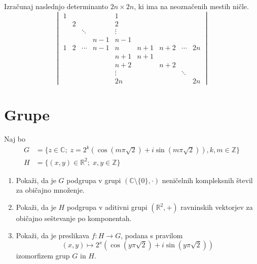 \documentclass[a4paper,12pt]{article}
\begin{document}
Izračunaj naslednjo determinanto \(2n \times 2n\), ki ima na neoznačenih mestih ničle.
\[\begin{vmatrix}
1 &   &        &     & 1   &     &     &        &    \\
  & 2 &        &     & 2   &     &     &        &    \\
  &   & \ddots &     & \vdots &  &     &        &    \\
  &   &        & n-1 & n-1 &     &     &        &    \\
1 & 2 & \cdots & n-1 & n   & n+1 & n+2 & \cdots & 2n \\
  &   &        &     & n+1 & n+1 &     &        &    \\
  &   &        &     & n+2 &     & n+2 &        &    \\
  &   &        &     & \vdots &  &     & \ddots &    \\
  &   &        &     & 2n  &     &     &        & 2n
\end{vmatrix}\]
%
%

\section*{Grupe}

Naj bo
\begin{align*}
G &= \{z \in \mathbb{C};\; z = 2^k(\cos(m\pi\sqrt{2}) + i\sin(m\pi\sqrt{2})), k, m \in \mathbb{Z}\} \\
H &= \{(x, y) \in \mathbb{R}^2;\; x, y \in \mathbb{Z}\}
\end{align*}
\begin{enumerate}
\item
Pokaži, da je \(G\) podgrupa v grupi \((\mathbb{C} \setminus \{0\}, \cdot)\)
neničelnih kompleksnih števil za običajno množenje.

\item
Pokaži, da je \(H\) podgrupa v aditivni grupi \((\mathbb{R}^2, +)\)
ravninskih vektorjev za običajno seštevanje po komponentah.

\item
Pokaži, da je preslikava \(f:H\to G\), podana s pravilom
\[(x, y) \mapsto 2^x(\cos(y\pi\sqrt{2}) + i\sin(y\pi\sqrt{2}))\]
izomorfizem grup \(G\) in \(H\).
\end{enumerate}
\end{document}

